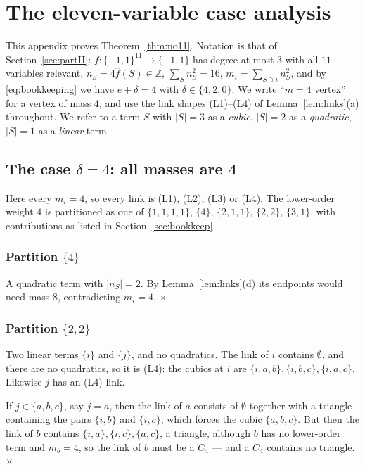 \documentclass[11pt,reqno]{amsart}
\theoremstyle{plain}
\theoremstyle{definition}
\numberwithin{theorem}{section}
\newcommand{\cube}{\{-1,1\}}
\newcommand{\bbZ}{\mathbb{Z}}
\newcommand{\Fhat}[1]{\widehat{#1}}
\begin{document}
\appendix

\section{The eleven-variable case analysis}\label{app:cases}

This appendix proves Theorem~\ref{thm:no11}. Notation is that of Section~\ref{sec:partII}:
$f \colon \cube^{11} \to \cube$ has degree at most $3$ with all $11$ variables relevant,
$n_S = 4\Fhat{f}(S) \in \bbZ$, $\sum_S n_S^2 = 16$, $m_i = \sum_{S \ni i} n_S^2$, and by
\eqref{eq:bookkeeping} we have $e + \delta = 4$ with $\delta \in \{4,2,0\}$. We write ``$m = 4$
vertex'' for a vertex of mass $4$, and use the link shapes (L1)--(L4) of
Lemma~\ref{lem:links}(a) throughout. We refer to a term $S$ with $|S| = 3$ as a \emph{cubic},
$|S| = 2$ as a \emph{quadratic}, $|S| = 1$ as a \emph{linear} term.

\subsection{The case \texorpdfstring{$\delta = 4$}{delta = 4}: all masses are 4}
\label{app:delta4}

Here every $m_i = 4$, so every link is (L1), (L2), (L3) or (L4). The lower-order weight $4$ is
partitioned as one of $\{1,1,1,1\}$, $\{4\}$, $\{2,1,1\}$, $\{2,2\}$, $\{3,1\}$, with
contributions as listed in Section~\ref{sec:bookkeep}.

\subsubsection*{Partition $\{4\}$} A quadratic term with $|n_S| = 2$. By
Lemma~\ref{lem:links}(d) its endpoints would need mass $8$, contradicting $m_i = 4$.
\hfill$\times$

\subsubsection*{Partition $\{2,2\}$} Two linear terms $\{i\}$ and $\{j\}$, and no quadratics.
The link of $i$ contains $\emptyset$, and there are no quadratics, so it is (L4): the cubics at
$i$ are $\{i,a,b\}, \{i,b,c\}, \{i,a,c\}$. Likewise $j$ has an (L4) link.

If $j \in \{a,b,c\}$, say $j = a$, then the link of $a$ consists of $\emptyset$ together with a
triangle containing the pairs $\{i,b\}$ and $\{i,c\}$, which forces the cubic $\{a,b,c\}$. But
then the link of $b$ contains $\{i,a\}, \{i,c\}, \{a,c\}$, a triangle, although $b$ has no
lower-order term and $m_b = 4$, so the link of $b$ must be a $C_4$ --- and a $C_4$ contains no
triangle. \hfill$\times$
\end{document}
